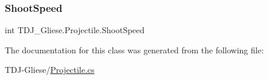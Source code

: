 \subsubsection{\texorpdfstring{Shoot\+Speed}{ShootSpeed}}
{\footnotesize\ttfamily int T\+D\+J\+\_\+\+Gliese.\+Projectile.\+Shoot\+Speed}



The documentation for this class was generated from the following file\+:\begin{DoxyCompactItemize}
\item 
T\+D\+J-\/\+Gliese/\hyperlink{_projectile_8cs}{Projectile.\+cs}\end{DoxyCompactItemize}
